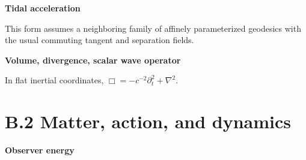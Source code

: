 \documentclass[
  11pt,
  letterpaper,
  oneside,
  openany]{scrbook}
\begin{document}
\textbf{Tidal acceleration}

\begin{center}
\begingroup
{}
\ifdim\wd\grmathbox>\linewidth
\resizebox{\linewidth}{!}{\usebox{\grmathbox}}
\else\usebox{\grmathbox}\fi
\endgroup
\end{center}

This form assumes a neighboring family of affinely parameterized
geodesics with the usual commuting tangent and separation fields.

\textbf{Volume, divergence, scalar wave operator}

\begin{center}
\begingroup
{}
\ifdim\wd\grmathbox>\linewidth
\resizebox{\linewidth}{!}{\usebox{\grmathbox}}
\else\usebox{\grmathbox}\fi
\endgroup
\end{center}

\begin{center}
\begingroup
{}
\ifdim\wd\grmathbox>\linewidth
\resizebox{\linewidth}{!}{\usebox{\grmathbox}}
\else\usebox{\grmathbox}\fi
\endgroup
\end{center}

In flat inertial coordinates, \(\Box=-c^{-2}\partial_t^2+\nabla^2\).

\hypertarget{b.2-matter-action-and-dynamics}{%
\section{B.2 Matter, action, and
dynamics}\label{b.2-matter-action-and-dynamics}}

\textbf{Observer energy}

\begin{center}
\begingroup
{}
\ifdim\wd\grmathbox>\linewidth
\resizebox{\linewidth}{!}{\usebox{\grmathbox}}
\else\usebox{\grmathbox}\fi
\endgroup
\end{center}
\end{document}
